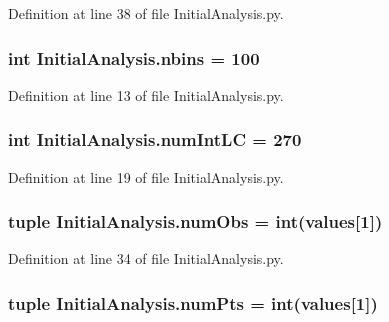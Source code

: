 Definition at line 38 of file Initial\-Analysis.\-py.

\hypertarget{namespace_initial_analysis_aff22a766f69daf1da0bf11d8b767dd69}{
\subsubsection[{nbins}]{\setlength{\rightskip}{0pt plus 5cm}int Initial\-Analysis.\-nbins = 100}}\label{namespace_initial_analysis_aff22a766f69daf1da0bf11d8b767dd69}


Definition at line 13 of file Initial\-Analysis.\-py.

\hypertarget{namespace_initial_analysis_ad5c01ec92c7e25854daeb2288e12e71a}{
\subsubsection[{num\-Int\-L\-C}]{\setlength{\rightskip}{0pt plus 5cm}int Initial\-Analysis.\-num\-Int\-L\-C = 270}}\label{namespace_initial_analysis_ad5c01ec92c7e25854daeb2288e12e71a}


Definition at line 19 of file Initial\-Analysis.\-py.

\hypertarget{namespace_initial_analysis_a886ea74f4787053abb1c8ff90587ce16}{
\subsubsection[{num\-Obs}]{\setlength{\rightskip}{0pt plus 5cm}tuple Initial\-Analysis.\-num\-Obs = int({\bf values}\mbox{[}1\mbox{]})}}\label{namespace_initial_analysis_a886ea74f4787053abb1c8ff90587ce16}


Definition at line 34 of file Initial\-Analysis.\-py.

\hypertarget{namespace_initial_analysis_af97ec4666037a95d5ae94bf162868749}{
\subsubsection[{num\-Pts}]{\setlength{\rightskip}{0pt plus 5cm}tuple Initial\-Analysis.\-num\-Pts = int({\bf values}\mbox{[}1\mbox{]})}}\label{namespace_initial_analysis_af97ec4666037a95d5ae94bf162868749}


